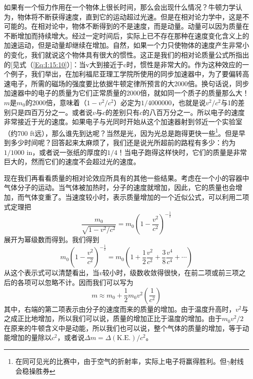如果有一个恒力作用在一个物体上很长时间，那么会出现什么情况？牛顿力学认为，物体将不断获得速度，直到它的运动超过光速。但是在相对论力学中，这是不可能的。在相对论中，物体不断得到的不是速度，而是动量。动量可以因为质量在不断增加而持续增大。经过一定时间后，实际上已不存在那种在速度变化含义上的加速运动，但是动量却继续在增加。自然，如果一个力只使物体的速度产生非常小的变化，我们就说这个物体具有很大的惯性。这正是我们的相对论质量公式所指出的[见式（\ref{Eq:I:15:10}）]：当v大到接近于c时，惯性是非常大的。作为这种效应的一个例子，我们举出，在加利福尼亚理工学院所使用的同步加速器中，为了要偏转高速电子，所需的磁场的强度要比依据牛顿定律所预言的大2000倍。换句话说，同步加速器中的电子的质量为它们正常质量的2000倍，就如同一个质子的质量那么大！ $m$是$m_0$的2000倍，意味着（$1-v^2/c^2$）必定为$1/4000000$，也就是说$v^2/c^2$与1的差别只是四百万分之一。或者说$v$与$c$的差别只有$c$的八百万分之一。所以电子的速度非常接近于光的速度。如果电子与光同时开始从这个加速器射到邻近一个实验室（约700 ft远），那么谁先到达呢？当然是光，因为光总是跑得更快一些\footnote{在同可见光的比赛中，由于空气的折射率，实际上电子将赢得胜利。但$\gamma$射线会稳操胜券}。但是早到多少时间呢？回答起来太麻烦了，我们还是说光所超前的路程有多少：约为$1/1000$ in，或者说一张纸的厚度的$1/4$！当电子跑得这样快时，它们的质量是非常巨大的，然而它们的速度不会超过光的速度。

现在我们再看看质量的相对论效应所具有的其他一些结果。考虑在一个小的容器中气体分子的运动。当气体被加热时，分子的速度就增加，因此，它的质量也会增加，而气体变重了。当速度较小时，表示质量增加的一个近似公式，可以利用二项式定理把
\begin{equation*}
    \frac{m_0}{\sqrt{1-v^2/c^2}}=m_0(1-\frac{v^2}{c^2})^{-\frac{1}{2}}
\end{equation*}
展开为幂级数而得到。我们得到
\begin{equation*}
    m_0(1-\frac{v^2}{c^2})^{-\frac{1}{2}}=m_0(1+\frac{1}{2} \frac{v^2}{c^2}+\frac{3}{8} \frac{v^4}{c^4}+\cdots)
\end{equation*}
从这个表示式可以清楚看出，当$v$较小时，级数收敛得很快，在前二项或前三项之后的各项可以忽略不计。因而我们可以写为
\begin{equation}
    \label{Eq:I:15:11}
    m \approx m_0+\frac{1}{2}m_0v^2(\frac{1}{c^2})
\end{equation}
其中，右端的第二项表示由分子的速度而来的质量的增加。由于温度升高时，$v^2$与之成正比地增加，所以我们可以说，质量的增加正比于温度的增加。由于$m_0v^2/2$在原来的牛顿含义中是动能，所以我们也可以说，整个气体的质量的增加，等于动能增加的量除以$c^2$，或者说$\Delta m = \Delta (\text{K.E.})/c^2$。

